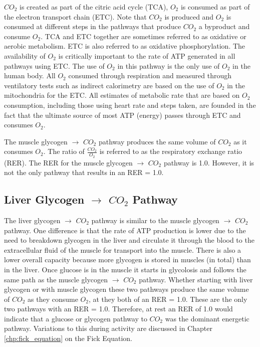 $CO_2$ is created as part of the citric acid cycle (TCA), $O_2$ is consumed as part of the electron transport chain (ETC). Note that $CO_2$ is produced and $O_2$ is consumed at different steps in the pathways that produce $CO_2$ a byproduct and consume $O_2$. TCA and ETC together are sometimes referred to as oxidative or aerobic metabolism. ETC is also referred to as oxidative phosphorylation. The availability of $O_2$ is critically important to the rate of ATP generated in all pathways using ETC. The use of $O_2$ in this pathway is the only use of $O_2$ in the human body. All $O_2$ consumed through respiration and measured through ventilatory tests such as indirect calorimetry are based on the use of $O_2$ in the mitochondria for the ETC. All estimates of metabolic rate that are based on $O_2$ consumption, including those using heart rate and steps taken, are founded in the fact that the ultimate source of most ATP (energy) passes through ETC and consumes $O_2$.

The muscle glycogen $\rightarrow$ $CO_2$ pathway produces the same volume of $CO_2$ as it consumes $O_2$. The ratio of $\frac{CO_2}{O_2}$ is referred to as the respiratory exchange ratio (RER). The RER for the muscle glycogen $\rightarrow$ $CO_2$ pathway is 1.0. However, it is not the only pathway that results in an RER = 1.0. 


\subsection{Liver Glycogen $\rightarrow$ $CO_2$ Pathway}

The liver glycogen $\rightarrow$ $CO_2$ pathway is similar to the muscle glycogen $\rightarrow$ $CO_2$ pathway. One difference is that the rate of ATP production is lower due to the need to breakdown glycogen in the liver and circulate it through the blood to the extracellular fluid of the muscle for transport into the muscle. There is also a lower overall capacity because more glycogen is stored in muscles (in total) than in the liver. Once glucose is in the muscle it starts in glycolosis and follows the same path as the muscle glycogen $\rightarrow$ $CO_2$ pathway. Whether starting with liver glycogen or with muscle glycogen these two pathways produce the same volume of $CO_2$ as they consume $O_2$, at they both of an RER = 1.0. These are the only two pathways with an RER = 1.0. Therefore, at rest an RER of 1.0 would indicate that a glucose or glycogen pathway to $CO_2$ was the dominant energetic pathway. Variations to this during activity are discussed in Chapter \ref{chp:fick_equation} on the Fick Equation.

